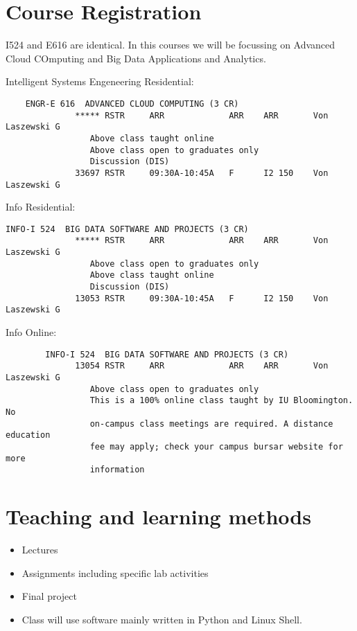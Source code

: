 \section{Course Registration}

I524 and E616 are identical. In this courses we will be focussing on
Advanced Cloud COmputing and Big Data Applications and Analytics. 

Intelligent Systems Engeneering Residential:

\begin{verbatim}
	ENGR-E 616  ADVANCED CLOUD COMPUTING (3 CR)
              ***** RSTR     ARR             ARR    ARR       Von Laszewski G
                 Above class taught online
                 Above class open to graduates only
                 Discussion (DIS)
              33697 RSTR     09:30A-10:45A   F      I2 150    Von Laszewski G
\end{verbatim}

Info Residential:

\begin{verbatim}
INFO-I 524  BIG DATA SOFTWARE AND PROJECTS (3 CR) 
              ***** RSTR     ARR             ARR    ARR       Von Laszewski G          
                 Above class open to graduates only
                 Above class taught online
                 Discussion (DIS)
              13053 RSTR     09:30A-10:45A   F      I2 150    Von Laszewski G  
\end{verbatim}

Info Online:

\begin{verbatim}        
        INFO-I 524  BIG DATA SOFTWARE AND PROJECTS (3 CR)
              13054 RSTR     ARR             ARR    ARR       Von Laszewski G          
                 Above class open to graduates only
                 This is a 100% online class taught by IU Bloomington. No
                 on-campus class meetings are required. A distance education
                 fee may apply; check your campus bursar website for more
                 information
\end{verbatim}


\section{Teaching and learning methods}

\begin{itemize}
\item	Lectures
\item	Assignments including specific lab activities
\item	Final project
\item Class will use software mainly written in Python
  and Linux Shell.
\end{itemize}


